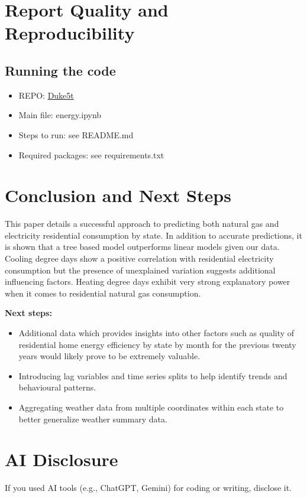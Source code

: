 \documentclass[11pt,a4paper]{article}
\begin{document}
\section{Report Quality and Reproducibility}
\subsection{Running the code}
\begin{itemize}[leftmargin=18pt]
  \item REPO: \href{https://github.com/Duke5t/EnergyConsumption}{Duke5t}
  \item Main file: energy.ipynb
  \item Steps to run: see README.md
  \item Required packages: see requirements.txt
\end{itemize}

\section{Conclusion and Next Steps}

This paper details a successful approach to predicting both natural gas and electricity residential consumption by state. In addition to accurate predictions, it is shown that a tree based model outperforms linear models given our data. Cooling degree days show a positive correlation with residential electricity consumption but the presence of unexplained variation suggests additional influencing factors. Heating degree days exhibit very strong explanatory power when it comes to residential natural gas consumption. 

\textbf{Next steps:} 
\begin{itemize}
\item Additional data which provides insights into other factors such as quality of residential home energy efficiency by state by month for the previous twenty years would likely prove to be extremely valuable. 
\item Introducing lag variables and time series splits to help identify trends and behavioural patterns.
\item Aggregating weather data from multiple coordinates within each state to better generalize weather summary data.
\end{itemize}
\section{AI Disclosure}
If you used AI tools (e.g., ChatGPT, Gemini) for coding or writing, disclose it.
\end{document}
